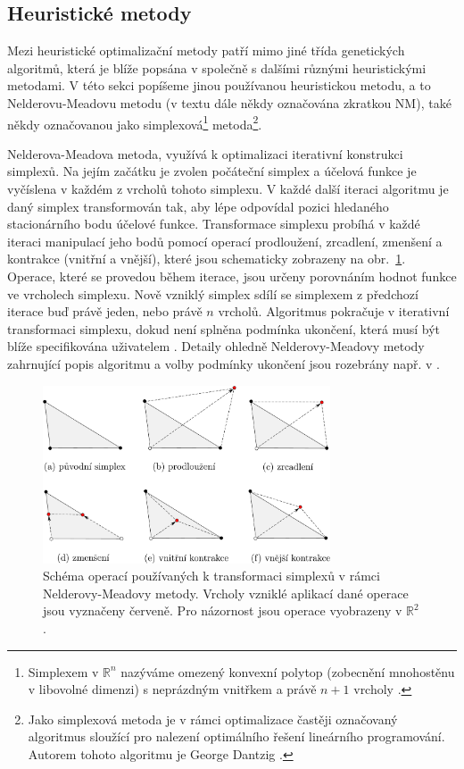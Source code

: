 \subsection{Heuristické metody}\label{heuristic}
Mezi heuristické optimalizační metody patří mimo jiné třída genetických algoritmů, která je blíže popsána v \cite{BBO-textbook} společně s dalšími různými heuristickými metodami. V této sekci popíšeme jinou používanou heuristickou metodu, a to Nelderovu-Meadovu metodu (v textu dále někdy označována zkratkou NM), také někdy označovanou jako simplexová\footnote{Simplexem v $ \mathbb{R}^n $ nazýváme omezený konvexní polytop (zobecnění mnohostěnu v libovolné dimenzi) s neprázdným vnitřkem a právě $ n+1 $ vrcholy \cite{BBO-textbook}.} metoda\footnote{Jako simplexová metoda je v rámci optimalizace častěji označovaný algoritmus sloužící pro nalezení optimálního řešení lineárního programování. Autorem tohoto algoritmu je George Dantzig \cite{Dantzig1990}.}\cite{Nelder1965}.

Nelderova-Meadova metoda, využívá k optimalizaci iterativní konstrukci simplexů. Na jejím začátku je zvolen počáteční simplex a účelová funkce je vyčíslena v každém z vrcholů tohoto simplexu. V každé další iteraci algoritmu je daný simplex transformován tak, aby lépe odpovídal pozici hledaného stacionárního bodu účelové funkce. Transformace simplexu probíhá v každé iteraci manipulací jeho bodů pomocí operací prodloužení, zrcadlení, zmenšení a kontrakce (vnitřní a vnější), které jsou schematicky zobrazeny na obr.~\ref{fig:NM operations}. Operace, které se provedou během iterace, jsou určeny porovnáním hodnot funkce ve vrcholech simplexu. Nově vzniklý simplex sdílí se simplexem z předchozí iterace buď právě jeden, nebo právě $ n $ vrcholů. Algoritmus pokračuje v iterativní transformaci simplexu, dokud není splněna podmínka ukončení, která musí být blíže specifikována uživatelem \cite{BBO-textbook}. Detaily ohledně Nelderovy-Meadovy metody zahrnující popis algoritmu a volby podmínky ukončení jsou rozebrány např. v \cite{BBO-textbook, derivative-free-review, Nelder1965}.

\begin{figure}[H]
	\vspace{5mm}
	\centering
	\includegraphics[width=0.76\textwidth]{Images/neldermead.pdf}
	\vspace{2mm}
	\caption{Schéma operací používaných k transformaci simplexů v rámci Nelderovy-Meadovy metody. Vrcholy vzniklé aplikací dané operace jsou vyznačeny červeně. Pro názornost jsou operace vyobrazeny v $ \mathbb{R}^2 $.}
	\vspace{2mm}
	\label{fig:NM operations}
\end{figure}


